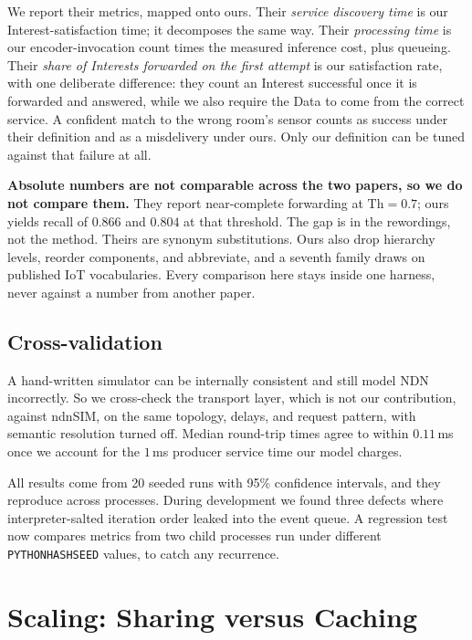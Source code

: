 \documentclass[conference]{IEEEtran}
\begin{document}
		We report their metrics, mapped onto ours. Their \emph{service discovery
			time} is our Interest-satisfaction time; it decomposes the same way. Their
		\emph{processing time} is our encoder-invocation count times the measured
		inference cost, plus queueing. Their \emph{share of Interests forwarded on
			the first attempt} is our satisfaction rate, with one deliberate
		difference: they count an Interest successful once it is forwarded and
		answered, while we also require the Data to come from the correct service.
		A confident match to the wrong room's sensor counts as success under their
		definition and as a misdelivery under ours. Only our definition can be
		tuned against that failure at all.
		
		\textbf{Absolute numbers are not comparable across the two papers, so we do
			not compare them.} They report near-complete forwarding at
		$\mathrm{Th}=0.7$; ours yields recall of $0.866$ and $0.804$ at that
		threshold. The gap is in the rewordings, not the method. Theirs are
		synonym substitutions. Ours also drop hierarchy levels, reorder
		components, and abbreviate, and a seventh family draws on published IoT
		vocabularies. Every comparison here stays inside one harness, never
		against a number from another paper.
		
		\subsection{Cross-validation}
		
		A hand-written simulator can be internally consistent and still model NDN
		incorrectly. So we cross-check the transport layer, which is not our
		contribution, against ndnSIM, on the same topology, delays, and request
		pattern, with semantic resolution turned off. Median round-trip times
		agree to within $0.11$\,ms once we account for the $1$\,ms producer
		service time our model charges.
		
		All results come from 20 seeded runs with 95\% confidence intervals, and
		they reproduce across processes. During development we found three
		defects where interpreter-salted iteration order leaked into the event
		queue. A regression test now compares metrics from two child processes run
		under different \texttt{PYTHONHASHSEED} values, to catch any recurrence.
		
		\section{Scaling: Sharing versus Caching}
		\label{sec:scaling}
		
\end{document}
